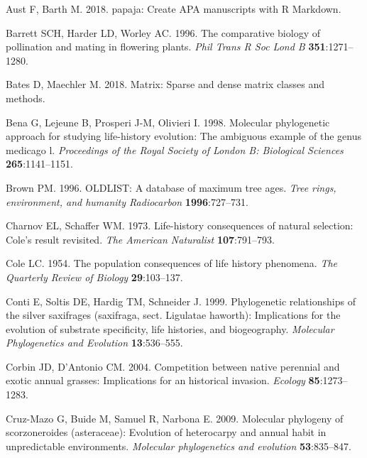 \documentclass[man,floatsintext]{apa6}
\theoremstyle{definition}
\theoremstyle{definition}
\theoremstyle{definition}
\theoremstyle{remark}
\begin{document}
\leavevmode\hypertarget{ref-R-papaja}{}%
Aust F, Barth M. 2018. papaja: Create APA manuscripts with R Markdown.

\leavevmode\hypertarget{ref-barrett1996comparative}{}%
Barrett SCH, Harder LD, Worley AC. 1996. The comparative biology of
pollination and mating in flowering plants. \emph{Phil Trans R Soc Lond
B} \textbf{351}:1271--1280.

\leavevmode\hypertarget{ref-R-Matrix}{}%
Bates D, Maechler M. 2018. Matrix: Sparse and dense matrix classes and
methods.

\leavevmode\hypertarget{ref-bena1998molecular}{}%
Bena G, Lejeune B, Prosperi J-M, Olivieri I. 1998. Molecular
phylogenetic approach for studying life-history evolution: The ambiguous
example of the genus medicago l. \emph{Proceedings of the Royal Society
of London B: Biological Sciences} \textbf{265}:1141--1151.

\leavevmode\hypertarget{ref-brown1996oldlist}{}%
Brown PM. 1996. OLDLIST: A database of maximum tree ages. \emph{Tree
rings, environment, and humanity Radiocarbon} \textbf{1996}:727--731.

\leavevmode\hypertarget{ref-charnov1973life}{}%
Charnov EL, Schaffer WM. 1973. Life-history consequences of natural
selection: Cole's result revisited. \emph{The American Naturalist}
\textbf{107}:791--793.

\leavevmode\hypertarget{ref-cole1954population}{}%
Cole LC. 1954. The population consequences of life history phenomena.
\emph{The Quarterly Review of Biology} \textbf{29}:103--137.

\leavevmode\hypertarget{ref-conti1999phylogenetic}{}%
Conti E, Soltis DE, Hardig TM, Schneider J. 1999. Phylogenetic
relationships of the silver saxifrages (saxifraga, sect. Ligulatae
haworth): Implications for the evolution of substrate specificity, life
histories, and biogeography. \emph{Molecular Phylogenetics and
Evolution} \textbf{13}:536--555.

\leavevmode\hypertarget{ref-corbin2004competition}{}%
Corbin JD, D'Antonio CM. 2004. Competition between native perennial and
exotic annual grasses: Implications for an historical invasion.
\emph{Ecology} \textbf{85}:1273--1283.

\leavevmode\hypertarget{ref-cruz2009molecular}{}%
Cruz-Mazo G, Buide M, Samuel R, Narbona E. 2009. Molecular phylogeny of
scorzoneroides (asteraceae): Evolution of heterocarpy and annual habit
in unpredictable environments. \emph{Molecular phylogenetics and
evolution} \textbf{53}:835--847.
\end{document}
